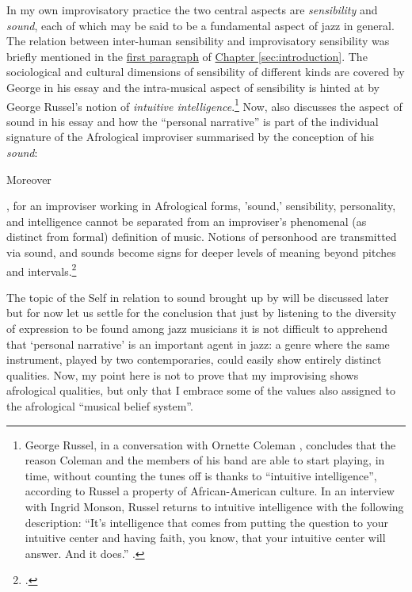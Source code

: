 In my own improvisatory practice the two central aspects are \emph{sensibility} and \emph{sound}, each of which may be said to be a fundamental aspect of jazz in general. The relation between inter-human sensibility and improvisatory sensibility was briefly mentioned in the \hyperlink{sec:target:introduction-1}{first paragraph} of \hyperref[sec:introduction]{Chapter \ref*{sec:introduction}}. The sociological and cultural dimensions of sensibility of different kinds are covered by George \citeauthor{lewis-1} in his essay  and the intra-musical aspect of sensibility is hinted at by George Russel's notion of \emph{intuitive intelligence}.\footnote{George Russel, in a conversation with Ornette Coleman \parencite[see][]{ornette85}, concludes that the reason Coleman and the members of his band are able to start playing, in time, without counting the tunes off is thanks to ``intuitive intelligence'', according to Russel a property of African-American culture. In an interview with Ingrid Monson, Russel returns to intuitive intelligence with the following description: ``It's intelligence that comes from putting the question to your intuitive center and having faith, you know, that your intuitive center will answer. And it does.'' \parencite[George Russel quoted in][154]{monson98}.} Now, \citeauthor{lewis-1} also discusses the aspect of sound in his essay and how the ``personal narrative'' is part of the individual signature of the Afrological improviser summarised by the conception of his \emph{sound}:
\begin{squote}
\hypertarget{sec:target:solo-impr-2002-1}{Moreover}, for an improviser working in Afrological forms, 'sound,' sensibility, personality, and intelligence cannot be separated from an improviser's phenomenal (as distinct from formal) definition of music. Notions of personhood are transmitted via sound, and sounds become signs for deeper levels of meaning beyond pitches and intervals.\footcite[117]{lewis-1}
\end{squote}
The topic of the Self in relation to sound brought up by \citeauthor{lewis-1} will be discussed later but for now let us settle for the conclusion that just by listening to the diversity of expression to be found among jazz musicians it is not difficult to apprehend that `personal narrative' is an important agent in jazz: a genre where the same instrument, played by two contemporaries, could easily show entirely distinct qualities. Now, my point here is not to prove that my improvising shows afrological qualities, but only that I embrace some of the values also assigned to the  afrological ``musical belief system''.

